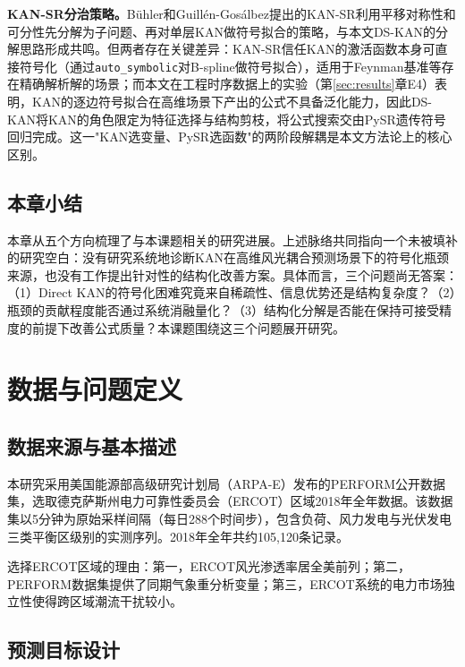 \documentclass[12pt,a4paper,oneside]{ctexbook}
\begin{document}
\textbf{KAN-SR分治策略。}Bühler和Guillén-Gosálbez\cite{buhler2025kansr}提出的KAN-SR利用平移对称性和可分性先分解为子问题、再对单层KAN做符号拟合的策略，与本文DS-KAN的分解思路形成共鸣。但两者存在关键差异：KAN-SR信任KAN的激活函数本身可直接符号化（通过\texttt{auto\_symbolic}对B-spline做符号拟合），适用于Feynman基准等存在精确解析解的场景；而本文在工程时序数据上的实验（第\ref{sec:results}章E4）表明，KAN的逐边符号拟合在高维场景下产出的公式不具备泛化能力，因此DS-KAN将KAN的角色限定为特征选择与结构剪枝，将公式搜索交由PySR遗传符号回归完成。这一"KAN选变量、PySR选函数"的两阶段解耦是本文方法论上的核心区别。

\section{本章小结}

本章从五个方向梳理了与本课题相关的研究进展。上述脉络共同指向一个未被填补的研究空白：没有研究系统地诊断KAN在高维风光耦合预测场景下的符号化瓶颈来源，也没有工作提出针对性的结构化改善方案。具体而言，三个问题尚无答案：（1）Direct KAN的符号化困难究竟来自稀疏性、信息优势还是结构复杂度？（2）瓶颈的贡献程度能否通过系统消融量化？（3）结构化分解是否能在保持可接受精度的前提下改善公式质量？本课题围绕这三个问题展开研究。


\chapter{数据与问题定义}

\section{数据来源与基本描述}

本研究采用美国能源部高级研究计划局（ARPA-E）发布的PERFORM公开数据集\cite{perform2023}，选取德克萨斯州电力可靠性委员会（ERCOT）区域2018年全年数据。该数据集以5分钟为原始采样间隔（每日288个时间步），包含负荷、风力发电与光伏发电三类平衡区级别的实测序列。2018年全年共约105,120条记录。

选择ERCOT区域的理由：第一，ERCOT风光渗透率居全美前列\cite{kaur2016net}；第二，PERFORM数据集提供了同期气象重分析变量；第三，ERCOT系统的电力市场独立性使得跨区域潮流干扰较小。

\section{预测目标设计}
\end{document}

